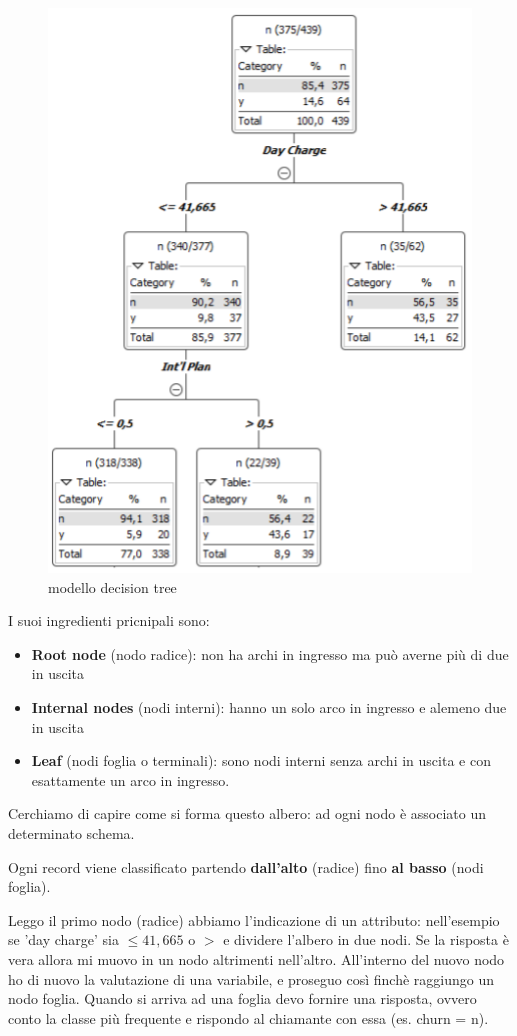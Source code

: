 \begin{figure}[H]
	\centering
	\includegraphics[height=0.7 \linewidth]{classification/pict/decision_tree.png}
	\caption{modello decision tree}
\end{figure}

I suoi ingredienti pricnipali sono:
\begin{itemize}
	\item \textbf{Root node} (nodo radice): non ha archi in ingresso ma può averne più di due in uscita
	\item \textbf{Internal nodes} (nodi interni): hanno un solo arco in ingresso e alemeno due in uscita
	\item \textbf{Leaf} (nodi foglia o terminali): sono nodi interni senza archi in uscita e con esattamente un arco in ingresso.
\end{itemize}

Cerchiamo di capire come si forma questo albero: ad ogni nodo è associato un determinato schema.

Ogni record viene classificato partendo \textbf{dall'alto} (radice) fino \textbf{al basso} (nodi foglia).

Leggo il primo nodo (radice) abbiamo l'indicazione di un attributo: nell'esempio se 'day charge' sia $\le 41,665$ o  $>$ e dividere l'albero in due nodi. Se la risposta è vera allora mi muovo in un nodo altrimenti nell'altro. All'interno del nuovo nodo ho di nuovo la valutazione di una variabile, e proseguo cos\`i finch\`e raggiungo un nodo foglia.
Quando si arriva ad una foglia devo fornire una risposta, ovvero conto la classe più frequente e rispondo al chiamante con essa (es. churn = n).

